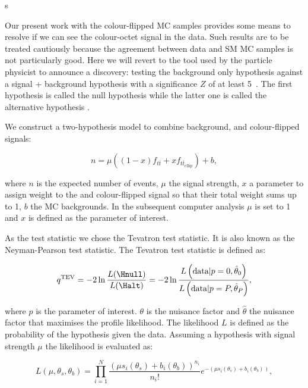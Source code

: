 s\label{subsec:hypo_testing}

Our present work with the colour-flipped MC samples provides some means to resolve if we can see the colour-octet \PW signal in the data. Such results are to be treated cautiously because the agreement between data and SM MC samples is not particularly good. Here we will revert to the tool used by the particle physicist to announce a discovery: testing the background only hypothesis against a signal + background hypothesis with a significance $Z$ of at least 5~\cite{Cowan:2010js}. The first hypothesis is called the null hypothesis \Hnull while the latter one is called the alternative hypothesis \Halt.

We construct a two-hypothesis model to combine background, \ttbar and colour-flipped \ttbar signals:

\begin{equation}
  n=\mu\left(\left(1-x\right)f_{t\overline{t}} + xf_{t\overline{t}_{\text{cflip}}}\right) + b,
  \label{eq:two_hypo_model}
\end{equation}

\noindent where $n$ is the expected number of events, $\mu$ \textendash the signal strength, $x$ \textendash a parameter to assign weight to the \ttbar and colour-flipped \ttbar signal so that their total weight sums up to 1, $b$ \textendash the MC backgrounds. In the subsequent computer analysis $\mu$ is set to 1 and $x$ is defined as the parameter of interest.

As the test statistic we chose the Tevatron test statistic. It is also known as the Neyman-Pearson test statistic. The Tevatron test statistic is defined as:

\begin{equation}
  q^{\text{TEV}}=-2\ln{\frac{L(\Hnull)}{L(\Halt)}}=-2\ln{\frac{L\left(\text{data}|p=0,\hat{\theta}_{0}\right)}{L\left(\text{data}|p=P,\hat{\theta}_{P}\right)}},
\end{equation}

\noindent where $p$ is the parameter of interest. $\theta$ is the nuisance factor and $\hat{\theta}$ \textendash the nuisance factor that maximises the profile likelihood. The likelihood $L$ is defined as the probability of the hypothesis given the data. Assuming a hypothesis with signal strength $\mu$ the likelihood is evaluated as:

\begin{equation}
  L(\mu, \theta_{s}, \theta_{b}) = \prod_{i=1}^{N}\frac{(\mu s_{i}(\theta_{s}) + b_{i}(\theta_{b}))^{n_{i}}}{n_{i}!}e^{-(\mu s_{i}(\theta_{s}) + b_{i}(\theta_{b}))},
\end{equation}

